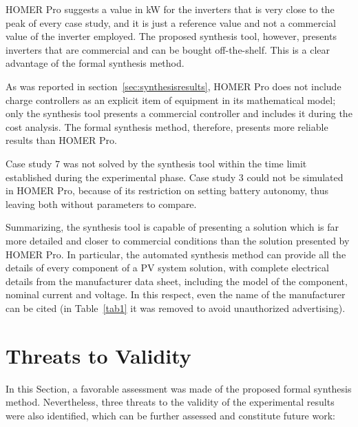 HOMER Pro suggests a value in kW for the inverters that is very close to the peak of every case study, and it is just a reference value and not a commercial value of the inverter employed. The proposed synthesis tool, however, presents inverters that are commercial and can be bought off-the-shelf. This is a clear advantage of the formal synthesis method.

As was reported in section~\ref{sec:synthesisresults}, HOMER Pro does not include charge controllers as an explicit item of equipment in its mathematical model; only the synthesis tool presents a commercial controller and includes it during the cost analysis. The formal synthesis method, therefore, presents more reliable results than HOMER Pro.

Case study $7$ was not solved by the synthesis tool within the time limit established during the experimental phase. Case study $3$ could not be simulated in HOMER Pro, because of its restriction on setting battery autonomy, thus leaving both without parameters to compare.

Summarizing, the synthesis tool is capable of presenting a solution which is far more detailed and closer to commercial conditions than the solution presented by HOMER Pro. In particular, the automated synthesis method can provide all the details of every component of a PV system solution, with complete electrical details from the manufacturer data sheet, including  the model of the component, nominal current and voltage. In this respect, even the name of the manufacturer can be cited (in Table~\ref{tab1} it was removed to avoid unauthorized advertising).

\section{Threats to Validity}

In this Section, a favorable assessment was made of the proposed formal synthesis method. Nevertheless, three threats to the validity of the experimental results were also identified, which can be further assessed and 
constitute future work: 

